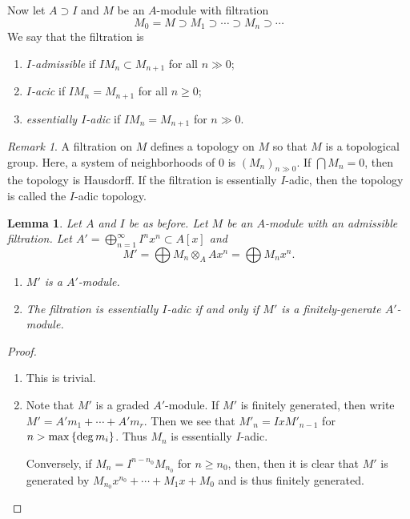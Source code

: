 \documentclass[leqno, openany]{memoir}
\newtheorem{lem}[thm]{Lemma}
\theoremstyle{definition}
\theoremstyle{remark}
\newtheorem{rmk}[thm]{Remark}
\theoremstyle{plain}
\theoremstyle{definition}
\theoremstyle{remark}
\begin{document}
Now let $A \supset I$ and $M$ be an $A$-module with filtration
\[ M_0 = M \supset M_1 \supset \cdots \supset M_n \supset \cdots \]
We say that the filtration is
\begin{enumerate}
    \item \textit{$I$-admissible} if $I M_n \subset M_{n+1}$ for all $n \gg 0$;
    \item \textit{$I$-acic} if $I M_n = M_{n+1}$ for all $n \geq 0$;
    \item \textit{essentially $I$-adic} if $I M_n = M_{n+1}$ for $n \gg 0$. 
\end{enumerate}

\begin{rmk}
    A filtration on $M$ defines a topology on $M$ so that $M$ is a topological group. Here, a system of neighborhoods of $0$ is $(M_n)_{n \gg 0}$. If $\bigcap M_n = 0$, then the topology is Hausdorff. If the filtration is essentially $I$-adic, then the topology is called the $I$-adic topology.
\end{rmk}

\begin{lem}
    Let $A$ and $I$ be as before. Let $M$ be an $A$-module with an admissible filtration. Let $A' = \bigoplus_{n=1}^{\infty} I^n x^n \subset A[x]$ and 
    \[ M' = \bigoplus M_n \otimes_A Ax^n = \bigoplus M_n x^n. \]
    \begin{enumerate}
        \item $M'$ is a $A'$-module.
        \item The filtration is essentially $I$-adic if and only if $M'$ is a finitely-generate $A'$-module.
    \end{enumerate}
\end{lem}

\begin{proof}
    \begin{enumerate}
        \item This is trivial.
        \item Note that $M'$ is a graded $A'$-module. If $M'$ is finitely generated, then write $M' = A' m_1 + \cdots + A' m_r$. Then we see that
            $ M'_n = I x M'_{n-1}$ 
            for $n > \max \qty{ \deg m_i }$. Thus $M_n$ is essentially $I$-adic.

            Conversely, if $M_n = I^{n - n_0} M_{n_0}$ for $n \geq n_0$, then, then it is clear that $M'$ is generated by $M_{n_0} x^{n_0} + \cdots + M_1 x + M_0$ and is thus finitely generated. \qedhere
    \end{enumerate}
\end{proof}
\end{document}
